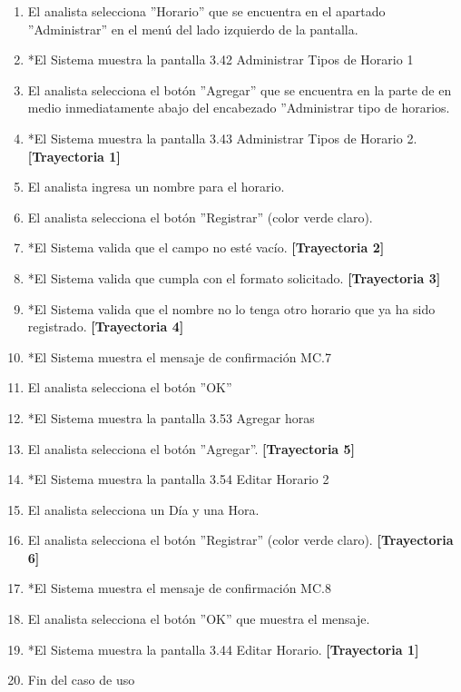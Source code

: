 \begin{enumerate}
    \item El analista selecciona ''Horario'' que se encuentra en el apartado ''Administrar'' en el menú del lado izquierdo de la pantalla.
    \item *El Sistema muestra la pantalla 3.42 Administrar Tipos de Horario 1
    \item El analista selecciona el botón ''Agregar'' que se encuentra en la parte de en medio inmediatamente abajo del encabezado ''Administrar  tipo de horarios.
    \item *El Sistema muestra la pantalla 3.43 Administrar Tipos de Horario 2. \textbf{[Trayectoria 1]}
    \item El analista ingresa un nombre para el horario.
    \item El analista selecciona el botón ''Registrar'' (color verde claro).
    \item *El Sistema valida que el campo no esté vacío. \textbf{[Trayectoria 2]}
    \item *El Sistema valida que cumpla con el formato solicitado. \textbf{[Trayectoria 3]}
    \item *El Sistema valida que el nombre no lo tenga otro horario que ya ha sido registrado. \textbf{[Trayectoria 4]}
    \item *El Sistema muestra el mensaje de confirmación MC.7
    \item El analista selecciona el botón ''OK''
    \item *El Sistema muestra la pantalla 3.53 Agregar horas
    \item El analista selecciona el botón ''Agregar''. \textbf{[Trayectoria 5]}
    \item *El Sistema muestra la pantalla 3.54 Editar Horario 2
    \item El analista selecciona un Día y una Hora. \item El analista selecciona el botón ''Registrar'' (color verde claro). \textbf{[Trayectoria 6]}
    \item *El Sistema muestra el mensaje de confirmación MC.8
    \item El analista selecciona el botón ''OK'' que muestra el mensaje.
    \item *El Sistema muestra la pantalla 3.44 Editar Horario. \textbf{[Trayectoria 1]}
    \item Fin del caso de uso
\end{enumerate}
\vspace*{1cm}
